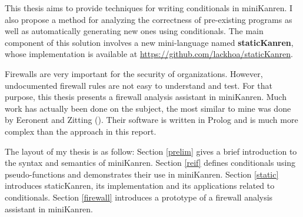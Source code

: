 \ifthesis This thesis aims to provide techniques for writing conditionals in miniKanren. I also propose a method for analyzing the correctness of pre-existing programs as well as automatically generating new ones using conditionals. The main component of this solution involves a new mini-language named \textbf{staticKanren}, whose implementation is available at \url{https://github.com/lackhoa/staticKanren}.

\else Firewalls are very important for the security of organizations. However, undocumented firewall rules are not easy to understand and test. For that purpose, this thesis presents a firewall analysis assistant in miniKanren. Much work has actually been done on the subject, the most similar to mine was done by Eeronent and Zitting (\cite{Eronen2001AnES}). Their software is written in Prolog and is much more complex than the approach in this report.\fi

The layout of my thesis is as follow: Section \ref{prelim} gives a brief introduction to the syntax and semantics of miniKanren.
\ifthesis Section \ref{reif} defines conditionals using pseudo-functions and demonstrates their use in miniKanren. Section \ref{static} introduces staticKanren, its implementation and its applications related to conditionals.
\else Section \ref{firewall} introduces a prototype of a firewall analysis assistant in miniKanren.\fi